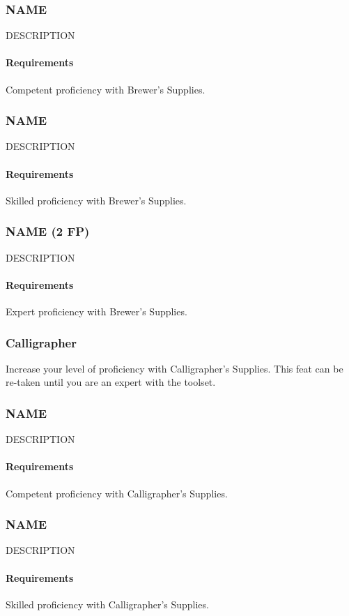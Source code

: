 \subsubsection{NAME} \label{feat::name}
    DESCRIPTION
    \paragraph{Requirements} Competent proficiency with Brewer's Supplies.
\subsubsection{NAME} \label{feat::name}
    DESCRIPTION
    \paragraph{Requirements} Skilled proficiency with Brewer's Supplies.
\subsubsection{NAME (2 FP)} \label{feat::name}
    DESCRIPTION
    \paragraph{Requirements} Expert proficiency with Brewer's Supplies.
\subsubsection{Calligrapher} \label{feat::calligrapher}
    Increase your level of proficiency with Calligrapher's Supplies.
    This feat can be re-taken until you are an expert with the toolset.
\subsubsection{NAME} \label{feat::name}
    DESCRIPTION
    \paragraph{Requirements} Competent proficiency with Calligrapher's Supplies.
\subsubsection{NAME} \label{feat::name}
    DESCRIPTION
    \paragraph{Requirements} Skilled proficiency with Calligrapher's Supplies.
